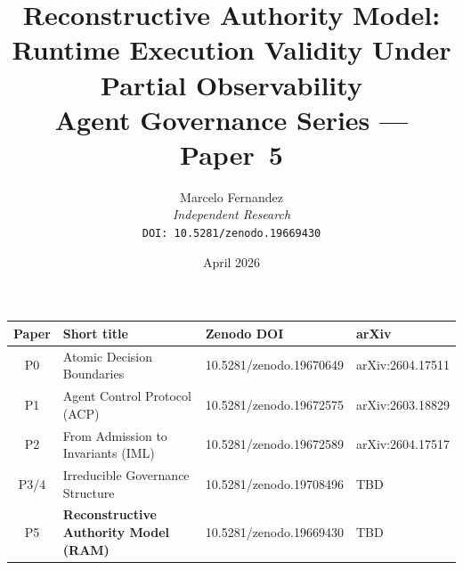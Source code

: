 \documentclass[11pt]{article}
\title{\textbf{Reconstructive Authority Model:}\\
       \textbf{Runtime Execution Validity Under Partial Observability}\\[0.5em]
       \large\normalfont Agent Governance Series --- Paper~5}
\author{Marcelo Fernandez\\
        \small\textit{Independent Research}\\
        \small\texttt{DOI: 10.5281/zenodo.19669430}}
\date{April 2026}
\begin{document}
\maketitle

\begin{center}
\small
\begin{tabular}{clll}
\toprule
\textbf{Paper} & \textbf{Short title} & \textbf{Zenodo DOI} & \textbf{arXiv}\\
\midrule
P0 & Atomic Decision Boundaries~\cite{fernandez2026a}     & 10.5281/zenodo.19670649 & arXiv:2604.17511\\
P1 & Agent Control Protocol (ACP)~\cite{fernandez2026b}   & 10.5281/zenodo.19672575 & arXiv:2603.18829\\
P2 & From Admission to Invariants (IML)~\cite{fernandez2026c} & 10.5281/zenodo.19672589 & arXiv:2604.17517\\
P3/4 & Irreducible Governance Structure~\cite{fernandez2026govstr} & 10.5281/zenodo.19708496 & TBD\\
P5 & \textbf{Reconstructive Authority Model (RAM)} & 10.5281/zenodo.19669430 & TBD\\
\bottomrule
\end{tabular}
\end{center}
\end{document}
